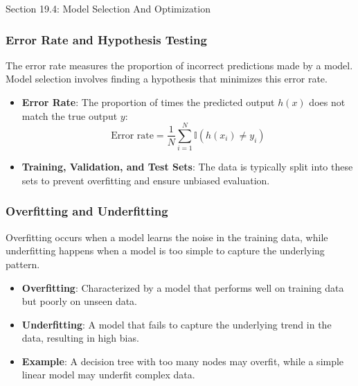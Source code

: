 \begin{notes}{Section 19.4: Model Selection And Optimization}
\begin{highlight}
    \end{highlight}
    
    \subsubsection*{Error Rate and Hypothesis Testing}
    
    The error rate measures the proportion of incorrect predictions made by a model. Model selection involves finding a hypothesis that minimizes this error rate.
    
    \begin{highlight}
    
        \begin{itemize}
            \item \textbf{Error Rate}: The proportion of times the predicted output $h(x)$ does not match the true output $y$:
            \[
            \text{Error rate} = \frac{1}{N} \sum_{i=1}^{N} \mathbb{I}(h(x_i) \neq y_i)
            \]
            \item \textbf{Training, Validation, and Test Sets}: The data is typically split into these sets to prevent overfitting and ensure unbiased evaluation.
        \end{itemize}
    
    \end{highlight}
    
    \subsubsection*{Overfitting and Underfitting}
    
    Overfitting occurs when a model learns the noise in the training data, while underfitting happens when a model is too simple to capture the underlying pattern.
    
    \begin{highlight}
    
        \begin{itemize}
            \item \textbf{Overfitting}: Characterized by a model that performs well on training data but poorly on unseen data.
            \item \textbf{Underfitting}: A model that fails to capture the underlying trend in the data, resulting in high bias.
            \item \textbf{Example}: A decision tree with too many nodes may overfit, while a simple linear model may underfit complex data.
        \end{itemize}
    

\end{highlight}
\end{notes}

